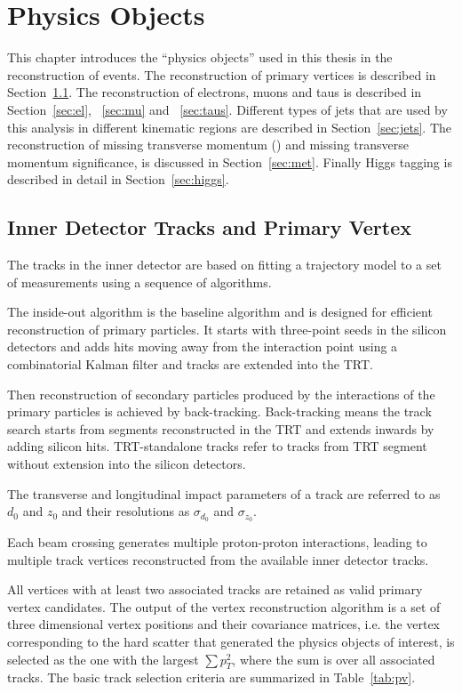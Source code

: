 \chapter{Physics Objects}

\label{ch:objects}

\par This chapter introduces the ``physics objects'' used in this thesis in the reconstruction of events. The reconstruction of primary vertices is described in Section~\ref{sec:pv}. 
The reconstruction of electrons, muons and taus is described in Section~\ref{sec:el}, ~\ref{sec:mu} and ~\ref{sec:taus}.
Different types of jets that are used by this analysis in different kinematic regions are described in Section~\ref{sec:jets}. 
The reconstruction of missing transverse momentum (\met) and missing transverse momentum significance, is discussed in Section~\ref{sec:met}. 
Finally Higgs tagging is described in detail in Section~\ref{sec:higgs}.

\section{Inner Detector Tracks and Primary Vertex}
\label{sec:pv}

\par The tracks in the inner detector are based on fitting a trajectory model to a set of measurements using a sequence of algorithms\cite{Cornelissen:1020106}.
\par The inside-out algorithm is the baseline algorithm and is designed for efficient reconstruction of primary particles. 
It starts with three-point seeds in the silicon detectors and adds hits moving away from the interaction point using a combinatorial Kalman filter 
and tracks are extended into the TRT.
\par Then reconstruction of secondary particles produced by the interactions of the primary particles is achieved by back-tracking. 
Back-tracking means the track search starts from segments reconstructed in the TRT and extends inwards by adding silicon hits. 
TRT-standalone tracks refer to tracks from TRT segment without extension into the silicon detectors.					
\par The transverse and longitudinal impact parameters of a track are referred to as $d_0$ and $z_0$ and their resolutions as $\sigma_{d_0}$ 
and $\sigma_{z_0}$. 
\par Each beam crossing generates multiple proton-proton interactions, leading to multiple track vertices reconstructed from the available inner detector tracks.
\par All vertices with at least two associated tracks are retained as valid primary vertex candidates. 
The output of the vertex reconstruction algorithm is a set of three dimensional vertex positions and their covariance matrices, i.e. the vertex corresponding to the hard scatter that generated the physics objects of interest, is selected as the one with the largest $\sum p_T^2$, where the sum is over all associated tracks. 
The basic track selection criteria are summarized in Table~\ref{tab:pv}.

